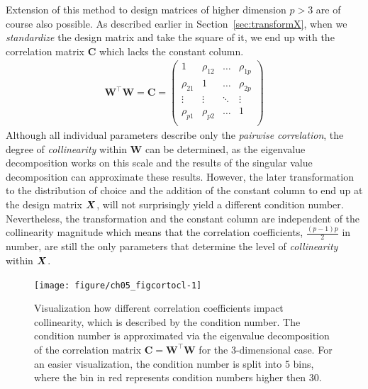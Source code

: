 \documentclass[11pt,a4paper,twoside]{book}\usepackage[]{graphicx}\usepackage[]{xcolor}
\newenvironment{knitrout}{}{} %
\begin{document}
Extension of this method to design matrices of higher dimension $p>3$ are of course also possible. As described earlier in Section~\ref{sec:transformX}, when we \textit{standardize} the design matrix and take the square of it, we end up with the correlation matrix $\boldsymbol{C}$ which lacks the constant column.
\begin{align}
\boldsymbol{W^\top W}=\boldsymbol{C}=
\begin{pmatrix}
  1 & \rho_{12} & \ldots & \rho_{1p}\\
  \rho_{21} & 1 & \ldots & \rho_{2p} \\
  \vdots & \vdots & \ddots & \vdots \\
  \rho_{p1} & \rho_{p2} & \ldots & 1\\
\end{pmatrix}\label{eq:corrmat}
\end{align}
Although all individual parameters describe only the \textit{pairwise correlation}, the degree of \textit{collinearity} within $\boldsymbol{W}$ can be determined, as the eigenvalue decomposition works on this scale and the results of the singular value decomposition can approximate these results.
However, the later transformation to the distribution of choice and the addition of the constant column to end up at the design matrix ${\boldsymbol{X}}$, will not surprisingly yield a different condition number.
Nevertheless, the transformation and the constant column are independent of the collinearity magnitude which means that the correlation coefficients, $\frac{(p-1)p}{2}$ in number, are still the only parameters that determine the level of \textit{collinearity} within ${\boldsymbol{X}}$.

\begin{figure}[H]%
\begin{center}
\begin{knitrout}
\color{fgcolor}
\texttt{[image: figure/ch05\_figcortocl-1]} 
\end{knitrout}
\end{center}
\vspace{-1cm}
\caption{Visualization how different correlation coefficients impact collinearity, which is described by the condition number. The condition number is approximated via the eigenvalue decomposition of the correlation matrix $\boldsymbol{C}=\boldsymbol{W^\top W}$ for the 3-dimensional case. For an easier visualization, the condition number is split into 5 bins, where the bin in red represents condition numbers higher then 30.}
\label{fig:cortocol}
\end{figure}
\end{document}

